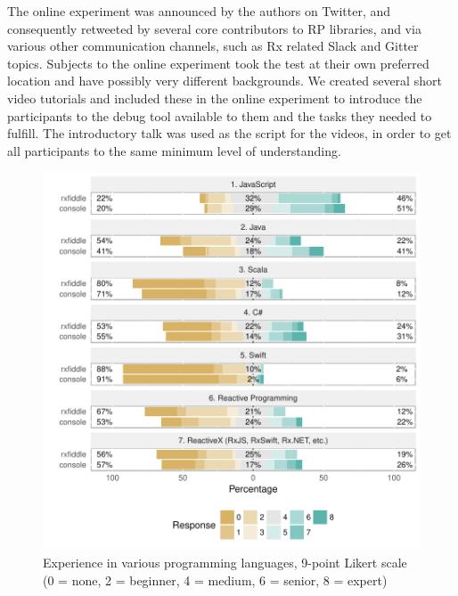 The online experiment was announced by the authors on Twitter, and
consequently retweeted by several core contributors to RP libraries, and
via various other communication channels, such as Rx related Slack and
Gitter topics.  Subjects to the online experiment took the test at their
own preferred location and have possibly very different backgrounds.
We created several short video tutorials and included these in the online
experiment to introduce the participants to the debug tool available to
them and the tasks they needed to fulfill.  The introductory talk was
used as the script for the videos, in order to get all participants to
the same minimum level of understanding.

\begin{figure}[t]
    \includegraphics[width=\columnwidth]{images/experience.pdf}
    \caption{Experience in various programming languages, 9-point Likert
    scale (0 = none, 2 = beginner, 4 = medium, 6 = senior, 8 = expert)}%
    \label{fig-experience}
\end{figure}
